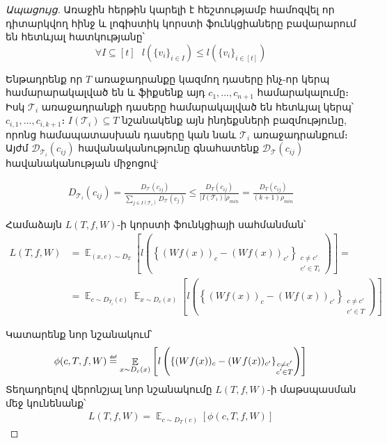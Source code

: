 \documentclass[12pt]{article}
\DeclareMathOperator*{\E}{\mathbb{E}}
\newcommand\defeq{\mathrel{\overset{\makebox[0pt]{\mbox{\normalfont\tiny\sffamily def}}}{=}}}
\begin{document}
\begin{proof}[Ապացույց]

Առաջին հերթին կարելի է հեշտությամբ համոզվել որ դիտարկվող հինջ և լոգիստիկ կորստի ֆունկցիաները բավարարում են հետևյալ հատկությանը՝
\begin{equation}
\label{prop_log_hinge}
\forall I \subseteq [t] \text{   }   l(\{v_i\}_{i\in I}) \leq l(\{v_i\}_{i \in [t]})
\end{equation}


Ենթադրենք որ $T$  առաջադրանքը կազմող դասերը ինչ-որ կերպ համարարակալված են և ֆիքսենք այդ  $c_1, ..., c_{n+1}$  համարակալումը։ Իսկ $\mathcal{T}_i$ առաջադրանքի դասերը համարակալված են հետևյալ կերպ՝ $c_{i,1}, ..., c_{i, {k+1}} $։ $I(\mathcal{T}_i) \subseteq T$  նշանակենք այն ինդեքսների բազմությունը, որոնց համապատասխան դասերը կան նաև $\mathcal{T}_i$ առաջադրանքում։  Այժմ $\mathcal{D}_{\mathcal{T}_i}(c_{ij})$ հավանականությունը գնահատենք $\mathcal{D}_{\mathcal{T}}(c_{ij})$ հավանականության միջոցով`

\begin{align*}
D_{\mathcal{T}_i}(c_{ij}) = \frac{D_\mathcal{T}(c_{ij})}{\sum_{j \in I(\mathcal{T}_i)}D_\mathcal{T}(c_j) } \leq \frac{D_{T}(c_{ij})}{|I(\mathcal{T}_i)|\rho_{min}} = \frac{D_{T}(c_{ij})}{(k+1)\rho_{min}}
\end{align*}

Համաձայն $L(T, f, W)$-ի կորստի ֆունկցիայի սահմանման՝
\begin{align*}
L(T, f, W) &= \E_{(x,c) \sim D_{T}} \left [               l \left( \left\{    (Wf(x))_c - (Wf(x))_{c'}     \right\}_{\substack{c \neq c' \\ c'\in T_i}} \right)          \right] = \\
&= \E_{c \sim D_{T_i}(c)}      \E_{x \sim D_{c}(x)}                      \left [               l \left( \left\{    (Wf(x))_c - (Wf(x))_{c'}     \right\}_{\substack{c \neq c' \\ c'\in T}} \right)          \right]
\end{align*}

\noindent Կատարենք նոր նշանակում՝
$$\phi(c, T, f, W) \defeq \E_{x \sim D_{c}(x)}                      \left [               l \left( \left\{    (Wf(x))_c - (Wf(x))_{c'}     \right\}_{\substack{c \neq c' \\ c'\in T}} \right)          \right]$$
Տեղադրելով վերոնշյալ նոր նշանակումը $L(T, f, W)$-ի մաթսպասման մեջ կունենանք՝
\begin{align*}
L(T, f, W) =  \E_{c \sim D_{T}(c)}  \left[ \phi(c, T, f, W) \right ]
\end{align*}


\end{proof}
\end{document}
